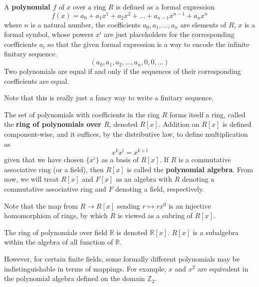 \documentclass{article}
\begin{document}
      \begin{definition}
        A \textbf{polynomial $f$} of $x$ over a ring $R$ is defined as a formal expression 
        \begin{equation}
          f(x) = a_0 + a_1 x^1 + a_2 x^2 + ...  + a_{n-1} x^{n-1} + a_n x^n
        \end{equation}
        where $n$ is a natural number, the coefficients $a_0, a_1, ..., a_n$ are elements of $R$, $x$ is a formal symbol, whose powers $x^i$ are just placeholders for the corresponding coefficients $a_i$ so that the given formal expression is a way to encode the infinite finitary sequence. 
        \begin{equation}
          (a_0, a_1, a_2, ..., a_n, 0, 0, ...)
        \end{equation}
        Two polynomials are equal if and only if the sequences of their corresponding coefficients are equal.
      \end{definition}

      Note that this is really just a fancy way to write a finitary sequence. 

      \begin{definition}
        The set of polynomials with coefficients in the ring $R$ forms itself a ring, called the \textbf{ring of polynomials over $R$}, denoted $R[x]$. Addition on $R[x]$ is defined component-wise, and it suffices, by the distributive law, to define multiplication as
        \begin{equation}
          x^k x^l = x^{k + l}
        \end{equation}
        given that we have chosen $\{x^i\}$ as a basis of $R[x]$. If $R$ is a commutative associative ring (or a field), then $R[x]$ is called the \textbf{polynomial algebra}. From now, we will treat $R[x]$ and $F[x]$ as an algebra with $R$ denoting a commutative associative ring and $F$ denoting a field, respectively. 
      \end{definition}

      Note that the map from $R \longrightarrow R[x]$ sending $r \mapsto r x^0$ is an injective homomorphism of rings, by which $R$ is viewed as a subring of $R[x]$. 

      The ring of polynomials over field $\mathbb{R}$ is denoted $\mathbb{R}[x]$. $R[x]$ is a subalgebra within the algebra of all function of $\mathbb{R}$. 

      However, for certain finite fields, some formally different polynomials may be indistinguishable in terms of mappings. For example, $x$ and $x^2$ are equivalent in the polynomial algebra defined on the domain $\mathbb{Z}_2$.
\end{document}
